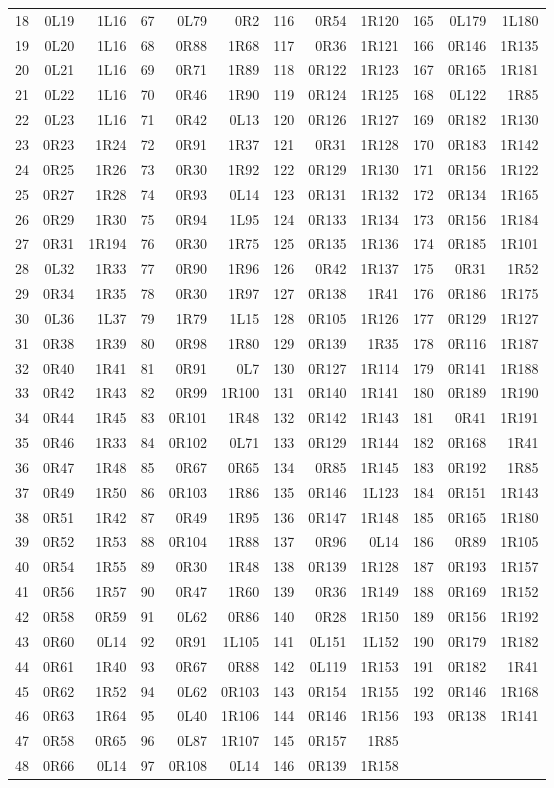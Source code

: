 \begin{center}
\begin{tabular}{rrr@{\hspace{12pt}}rrr@{\hspace{12pt}}rrr@{\hspace{12pt}}rrr}
18&0L19&1L16&67&0L79&0R2&116&0R54&1R120&165&0L179&1L180\\
19&0L20&1L16&68&0R88&1R68&117&0R36&1R121&166&0R146&1R135\\
20&0L21&1L16&69&0R71&1R89&118&0R122&1R123&167&0R165&1R181\\
21&0L22&1L16&70&0R46&1R90&119&0R124&1R125&168&0L122&1R85\\
22&0L23&1L16&71&0R42&0L13&120&0R126&1R127&169&0R182&1R130\\
23&0R23&1R24&72&0R91&1R37&121&0R31&1R128&170&0R183&1R142\\
24&0R25&1R26&73&0R30&1R92&122&0R129&1R130&171&0R156&1R122\\
25&0R27&1R28&74&0R93&0L14&123&0R131&1R132&172&0R134&1R165\\
26&0R29&1R30&75&0R94&1L95&124&0R133&1R134&173&0R156&1R184\\
27&0R31&1R194&76&0R30&1R75&125&0R135&1R136&174&0R185&1R101\\
28&0L32&1R33&77&0R90&1R96&126&0R42&1R137&175&0R31&1R52\\
29&0R34&1R35&78&0R30&1R97&127&0R138&1R41&176&0R186&1R175\\
30&0L36&1L37&79&1R79&1L15&128&0R105&1R126&177&0R129&1R127\\
31&0R38&1R39&80&0R98&1R80&129&0R139&1R35&178&0R116&1R187\\
32&0R40&1R41&81&0R91&0L7&130&0R127&1R114&179&0R141&1R188\\
33&0R42&1R43&82&0R99&1R100&131&0R140&1R141&180&0R189&1R190\\
34&0R44&1R45&83&0R101&1R48&132&0R142&1R143&181&0R41&1R191\\
35&0R46&1R33&84&0R102&0L71&133&0R129&1R144&182&0R168&1R41\\
36&0R47&1R48&85&0R67&0R65&134&0R85&1R145&183&0R192&1R85\\
37&0R49&1R50&86&0R103&1R86&135&0R146&1L123&184&0R151&1R143\\
38&0R51&1R42&87&0R49&1R95&136&0R147&1R148&185&0R165&1R180\\
39&0R52&1R53&88&0R104&1R88&137&0R96&0L14&186&0R89&1R105\\
40&0R54&1R55&89&0R30&1R48&138&0R139&1R128&187&0R193&1R157\\
41&0R56&1R57&90&0R47&1R60&139&0R36&1R149&188&0R169&1R152\\
42&0R58&0R59&91&0L62&0R86&140&0R28&1R150&189&0R156&1R192\\
43&0R60&0L14&92&0R91&1L105&141&0L151&1L152&190&0R179&1R182\\
44&0R61&1R40&93&0R67&0R88&142&0L119&1R153&191&0R182&1R41\\
45&0R62&1R52&94&0L62&0R103&143&0R154&1R155&192&0R146&1R168\\
46&0R63&1R64&95&0L40&1R106&144&0R146&1R156&193&0R138&1R141\\
47&0R58&0R65&96&0L87&1R107&145&0R157&1R85&&&\\
48&0R66&0L14&97&0R108&0L14&146&0R139&1R158&&&\\
\bottomrule
\end{tabular}
\end{center}
